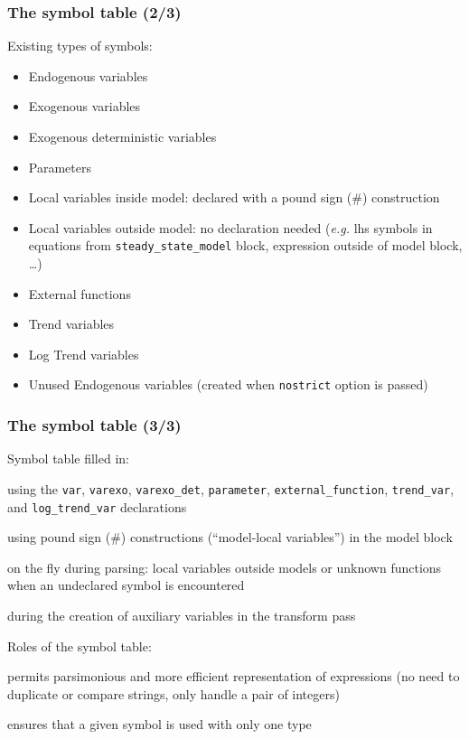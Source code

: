 \documentclass[aspectratio=169]{beamer}
\newenvironment{witemize}{\itemize\addtolength{\itemsep}{8pt}}{\enditemize}
\begin{document}
\begin{frame}
  \frametitle{The symbol table (2/3)}
  Existing types of symbols:
  \begin{itemize}
  \item Endogenous variables
  \item Exogenous variables
  \item Exogenous deterministic variables
  \item Parameters
  \item Local variables inside model: declared with a pound sign (\#) construction
  \item Local variables outside model: no declaration needed (\textit{e.g.} lhs symbols in equations from \texttt{steady\_state\_model} block, expression outside of model block, \ldots)
  \item External functions
  \item Trend variables
  \item Log Trend variables
  \item Unused Endogenous variables (created when \texttt{nostrict} option is passed)
  \end{itemize}
\end{frame}

\begin{frame}
  \frametitle{The symbol table (3/3)}
  \begin{witemize}
  \item Symbol table filled in:
    \begin{witemize}
    \item using the \texttt{var}, \texttt{varexo}, \texttt{varexo\_det}, \texttt{parameter}, \texttt{external\_function}, \texttt{trend\_var}, and \texttt{log\_trend\_var} declarations
    \item using pound sign (\#) constructions (``model-local variables'') in the model block
    \item on the fly during parsing: local variables outside models or unknown functions when an undeclared symbol is encountered
    \item during the creation of auxiliary variables in the transform pass
    \end{witemize}
  \item Roles of the symbol table:
    \begin{witemize}
    \item permits parsimonious and more efficient representation of expressions (no need to duplicate or compare strings, only handle a pair of integers)
    \item ensures that a given symbol is used with only one type
    \end{witemize}
  \end{witemize}
\end{frame}
\end{document}
